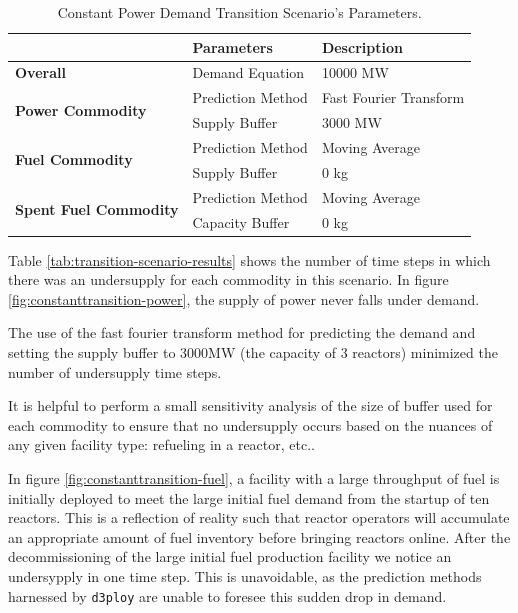 \documentclass[11pt,letterpaper]{article}
\newcommand{\deploy}{\texttt{d3ploy}\xspace}%
\begin{document}
\begin{table}[!htbp]
	\centering
	\caption {Constant Power Demand Transition Scenario's Parameters.}
	\label{tab:transition-scenario-constant-power}
	\begin{tabular}{|l|l|p{}|}
		\hline
		& \textbf{Parameters}    & \textbf{Description} \\ \hline
		\textbf{Overall}& Demand Equation & 10000 MW \\ \hline
		\multirow{2}{*}{\textbf{Power Commodity}} & Prediction Method      &  Fast Fourier Transform\\ \cline{2-3} 
		& Supply Buffer          &  3000 MW \\ \hline
		\multirow{2}{*}{\textbf{Fuel Commodity}}  & Prediction Method      &  Moving Average\\ \cline{2-3}
		& Supply Buffer & 0 kg \\ \hline
		\multirow{2}{*}{\textbf{Spent Fuel Commodity}}  & Prediction Method      &  Moving Average\\ \cline{2-3}
		& Capacity Buffer & 0 kg \\ \hline
	\end{tabular}
\end{table}

Table \ref{tab:transition-scenario-results} shows the number of time 
steps in which there was an undersupply for each commodity in this scenario. 
In figure \ref{fig:constanttransition-power}, the supply of power never falls under demand.

The use of the fast fourier transform method for predicting the
demand and setting the supply buffer to 3000MW (the capacity of 3 reactors)
minimized the number of undersupply time steps.

It is helpful to perform a small sensitivity analysis of the size 
of buffer used for each commodity to ensure that no 
undersupply occurs based on the nuances of any given facility type: 
refueling in a reactor, etc.. 

In figure \ref{fig:constanttransition-fuel},
a facility with a large throughput of fuel is initially
deployed to meet the large initial fuel demand from the startup of ten reactors. 
This is a reflection of reality such that reactor operators will 
accumulate an appropriate amount of fuel inventory before bringing reactors online. 
After the decommissioning of the large initial fuel production facility we notice an undersypply in one time step.
This is unavoidable, as the prediction methods harnessed by \deploy are unable 
to foresee this sudden drop in demand. 
\end{document}
